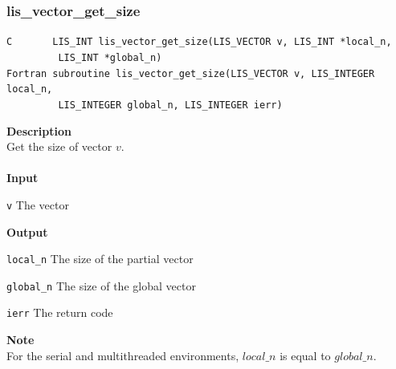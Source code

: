 \documentclass[a4paper]{article}
\newcommand{\namelistlabel}[1]{\mbox{#1}\hfill}
\newenvironment{namelist}[1]{%
\begin{list}{}
  {\let\makelabel\namelistlabel
  \settowidth{\labelwidth}{#1}
  \setlength{\leftmargin}{1.1\labelwidth}}
  }{%
\end{list}}
\begin{document}
\subsubsection{lis\_vector\_get\_size}
\begin{screen}
\verb|C       LIS_INT lis_vector_get_size(LIS_VECTOR v, LIS_INT *local_n,|\\
\verb|         LIS_INT *global_n)|\\
\verb|Fortran subroutine lis_vector_get_size(LIS_VECTOR v, LIS_INTEGER local_n,|\\
\verb|         LIS_INTEGER global_n, LIS_INTEGER ierr)|
\end{screen}
{\bf Description}\\
\indent
Get the size of vector $v$.
\\ \\
\noindent
{\bf Input}
\begin{namelist}{XXXXXXXXXXXXXXXXXXXX}
\item[\tt v] The vector
\end{namelist}
{\bf Output}
\begin{namelist}{XXXXXXXXXXXXXXXXXXXX}
\item[\tt local\_n] The size of the partial vector
\item[\tt global\_n] The size of the global vector
\item[\tt ierr] The return code
\end{namelist}
{\bf Note}\\
\indent
For the serial and multithreaded environments, $local\_n$ is equal to $global\_n$. 
\end{document}
